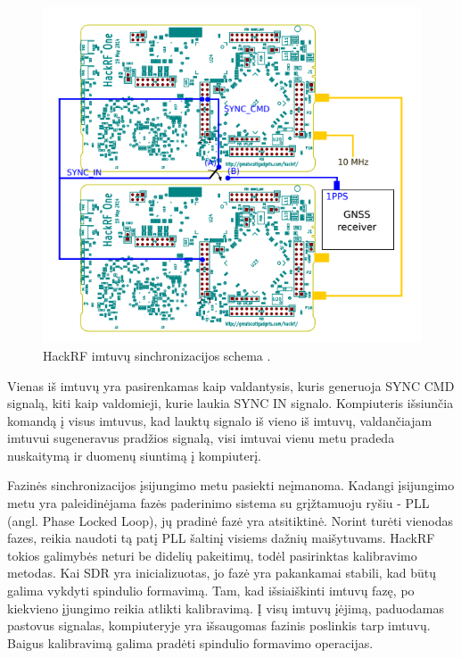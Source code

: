 \documentclass[main.tex]{subfiles}
\begin{document}
\begin{figure}[h]
    \begin{centering}
    \includegraphics[scale=0.8]{drawings/hackrf_sync}
    \par\end{centering}
    \protect\caption{\label{fig:hackrf_sync}HackRF imtuvų sinchronizacijos schema \cite{hackrf_sync}.}
\end{figure}

Vienas iš imtuvų yra pasirenkamas kaip valdantysis, kuris generuoja SYNC CMD signalą,
kiti kaip valdomieji, kurie laukia SYNC IN signalo. Kompiuteris
išsiunčia komandą į visus imtuvus, kad lauktų signalo iš vieno iš imtuvų,
valdančiajam imtuvui sugeneravus pradžios signalą, visi imtuvai vienu metu pradeda
nuskaitymą ir duomenų siuntimą į kompiuterį.

Fazinės sinchronizacijos įsijungimo metu pasiekti neįmanoma. Kadangi įsijungimo metu yra
paleidinėjama fazės paderinimo sistema su grįžtamuoju ryšiu - PLL (angl. Phase Locked Loop), jų pradinė fazė yra atsitiktinė.
Norint turėti vienodas fazes, reikia naudoti tą patį PLL šaltinį visiems
dažnių maišytuvams. HackRF tokios galimybės neturi be didelių pakeitimų, todėl pasirinktas
kalibravimo metodas.
Kai SDR yra inicializuotas, jo fazė yra pakankamai stabili, kad būtų galima
vykdyti spindulio formavimą.
Tam, kad išsiaiškinti imtuvų fazę, po kiekvieno įjungimo reikia atlikti kalibravimą.
Į visų imtuvų įėjimą, paduodamas pastovus signalas, kompiuteryje yra išsaugomas
fazinis poslinkis tarp imtuvų. Baigus kalibravimą galima pradėti spindulio
formavimo operacijas.
\end{document}

